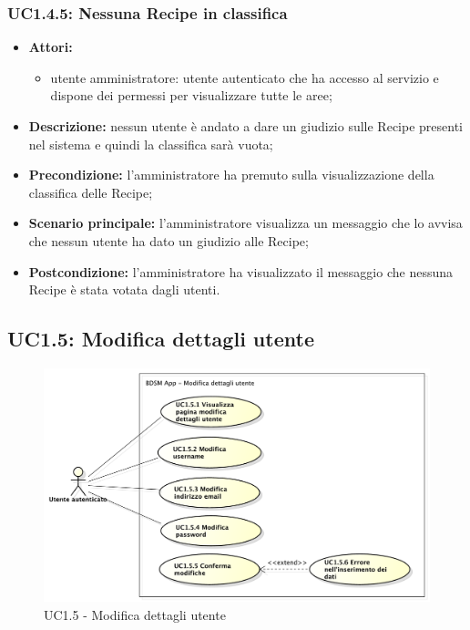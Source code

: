\subsubsection{UC1.4.5: Nessuna Recipe in classifica}
\begin{itemize}
	\item \textbf{Attori:}
	\begin{itemize}
		\item utente amministratore: utente autenticato che ha accesso al servizio e dispone dei permessi per visualizzare tutte le aree;
	\end{itemize}
	\item \textbf{Descrizione:} nessun utente è andato a dare un giudizio sulle Recipe presenti nel sistema e quindi la classifica sarà vuota;
	\item \textbf{Precondizione:} l'amministratore ha premuto sulla visualizzazione della classifica delle Recipe;
	\item \textbf{Scenario principale:} l'amministratore visualizza un messaggio che lo avvisa che nessun utente ha dato un giudizio alle Recipe;
	\item \textbf{Postcondizione:} l'amministratore ha visualizzato il messaggio che nessuna Recipe è stata votata dagli utenti.
\end{itemize}

\pagebreak


\subsection{UC1.5: Modifica dettagli utente}
\begin{figure}[!ht]
	\centering
	\centerline{\includegraphics[scale=0.45]{./images/UC1_5.pdf}}
	\caption{UC1.5 - Modifica dettagli utente}
\end{figure}

